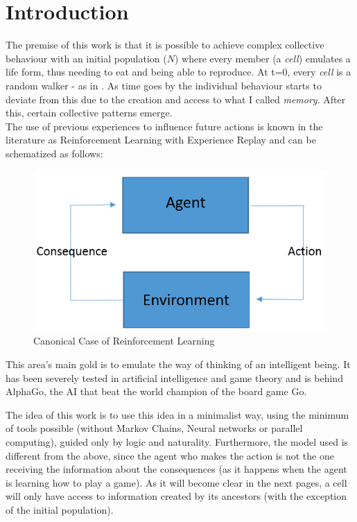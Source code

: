 \documentclass[a4paper,prd,twocolumn,nofootinbib,superscriptaddress,floatfix]{revtex4}
\begin{document}
\section{Introduction}
The premise of this work is that it is possible to achieve complex collective behaviour with an initial population ($N$) where every member (a \textit{cell}) emulates a life form, thus needing to eat and being able to reproduce. At t=0, every \textit{cell} is a random walker - as in \cite{randwalk}. As time goes by the individual behaviour starts to deviate from this due to the creation and access to what I called \textit{memory}. After this, certain collective patterns emerge.\\
The use of previous experiences to influence future actions is known in the literature as Reinforcement Learning with Experience Replay \cite{reinforcementlearning} and can be schematized as follows:\\
\begin{figure}[H]
\centering
  \includegraphics[scale=0.2]{scheme.png}
\caption{Canonical Case of Reinforcement Learning}
  \label{fig:1}
\end{figure}

This area's main gold is to emulate the way of thinking of an intelligent being. It has been severely tested in artificial intelligence and game theory  and is behind AlphaGo, the AI that beat the world champion of the board game Go. \cite{go}

The idea of this work is to use this idea in a minimalist way, using the minimum of tools possible (without Markov Chains, Neural networks or parallel computing), guided only by logic and naturality.
Furthermore, the model used is different from the above, since the agent who makes the action is not the one receiving the information about the consequences (as it happens when the agent is learning how to play a game). As it will become clear in the next pages,  a cell will only have access to information created by its ancestors (with the exception of the initial population). 
\end{document}
